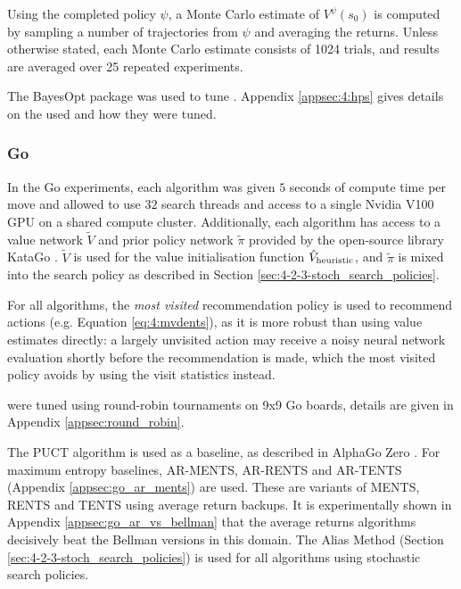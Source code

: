     Using the completed policy $\psi$, a Monte Carlo estimate of $V^{\psi}(s_0)$ is computed by sampling a number of trajectories from $\psi$ and averaging the returns. Unless otherwise stated, each Monte Carlo estimate consists of 1024 trials, and results are averaged over 25 repeated experiments.

    The BayesOpt package \cite{bayesopt} was used to tune . Appendix \ref{appsec:4:hps} gives details on the  used and how they were tuned.



\subsubsection{Go}
    In the Go experiments, each algorithm was given $5$ seconds of compute time per move and allowed to use $32$ search threads and access to a single Nvidia V100 GPU on a shared compute cluster. Additionally, each algorithm has access to a value network $\tilde{V}$ and prior policy network $\tilde{\pi}$ provided by the open-source library KataGo \cite{katago}. $\tilde{V}$ is used for the value initialisation function ${\hat{V}_{\textnormal{heuristic}}}$, and $\tilde{\pi}$ is mixed into the search policy as described in Section \ref{sec:4-2-3-stoch_search_policies}.

    For all algorithms, the \textit{most visited} recommendation 
    policy is used to recommend actions (e.g. Equation 
    \ref{eq:4:mvdents}), as it is more robust than using 
    value estimates directly: a largely unvisited action may 
    receive a noisy neural network evaluation shortly before 
    the recommendation is made, which the most visited policy 
    avoids by using the visit statistics instead.

     were tuned using round-robin tournaments on 9x9 Go boards, details are given in Appendix \ref{appsec:round_robin}.

    The PUCT algorithm is used as a baseline, as described in AlphaGo Zero \cite{alpha_go_zero}. For maximum entropy baselines, AR-MENTS, AR-RENTS and AR-TENTS (Appendix \ref{appsec:go_ar_ments}) are used. These are variants of MENTS, RENTS and TENTS using average return backups. It is experimentally shown in Appendix \ref{appsec:go_ar_vs_bellman} that the average returns algorithms decisively beat the Bellman versions in this domain. The Alias Method (Section \ref{sec:4-2-3-stoch_search_policies}) is used for all algorithms using stochastic search policies.

